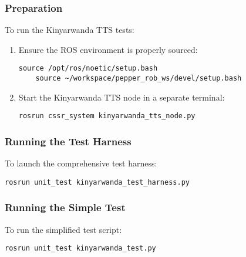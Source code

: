 \documentclass{CSSRforAfrica}
\begin{document}
\subsubsection{Preparation}
To run the Kinyarwanda TTS tests:

\begin{enumerate}
    \item Ensure the ROS environment is properly sourced:
    \begin{lstlisting}[style=commandstyle]
    source /opt/ros/noetic/setup.bash
    source ~/workspace/pepper_rob_ws/devel/setup.bash
    \end{lstlisting}
    
    \item Start the Kinyarwanda TTS node in a separate terminal:
    \begin{lstlisting}[style=commandstyle]
    rosrun cssr_system kinyarwanda_tts_node.py
    \end{lstlisting}
\end{enumerate}

\subsubsection{Running the Test Harness}
To launch the comprehensive test harness:
\begin{lstlisting}[style=commandstyle]
rosrun unit_test kinyarwanda_test_harness.py
\end{lstlisting}

\subsubsection{Running the Simple Test}
To run the simplified test script:
\begin{lstlisting}[style=commandstyle]
rosrun unit_test kinyarwanda_test.py
\end{lstlisting}

\end{document}
